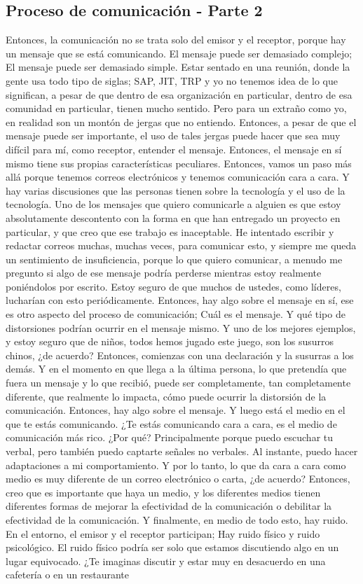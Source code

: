 \documentclass[10pt]{book}
\begin{document}
\subsection{Proceso de comunicación - Parte 2}
Entonces, la comunicación no se trata solo del emisor y el receptor, porque hay un mensaje que se está comunicando. El mensaje puede ser demasiado complejo; El mensaje puede ser demasiado simple.  Estar sentado en una reunión, donde la gente usa todo tipo de siglas; SAP, JIT, TRP y yo no tenemos idea de lo que significan, a pesar de que dentro de esa organización en particular, dentro de esa comunidad en particular, tienen mucho sentido. Pero para un extraño como yo, en realidad son un montón de jergas que no entiendo. Entonces, a pesar de que el mensaje puede ser importante, el uso de tales jergas puede hacer que sea muy difícil para mí, como receptor, entender el mensaje. Entonces, el mensaje en sí mismo tiene sus propias características peculiares. Entonces, vamos un paso más allá porque tenemos correos electrónicos y tenemos comunicación cara a cara. Y hay varias discusiones que las personas tienen sobre la tecnología y el uso de la tecnología. Uno de los mensajes que quiero comunicarle a alguien es que estoy absolutamente descontento con la forma en que han entregado un proyecto en particular, y que creo que ese trabajo es inaceptable. He intentado escribir y redactar correos muchas, muchas veces, para comunicar esto, y siempre me queda un sentimiento de insuficiencia, porque lo que quiero comunicar, a menudo me pregunto si algo de ese mensaje podría perderse mientras estoy realmente poniéndolos por escrito. Estoy seguro de que muchos de ustedes, como líderes, lucharían con esto periódicamente. Entonces, hay algo sobre el mensaje en sí, ese es otro aspecto del proceso de comunicación; Cuál es el mensaje. Y qué tipo de distorsiones podrían ocurrir en el mensaje mismo. Y uno de los mejores ejemplos, y estoy seguro que de niños, todos hemos jugado este juego, son los susurros chinos, ¿de acuerdo? Entonces, comienzas con una declaración y la susurras a los demás. Y en el momento en que llega a la última persona, lo que pretendía que fuera un mensaje y lo que recibió, puede ser completamente, tan completamente diferente, que realmente lo impacta, cómo puede ocurrir la distorsión de la comunicación. Entonces, hay algo sobre el mensaje. Y luego está el medio en el que te estás comunicando. ¿Te estás comunicando cara a cara, es el medio de comunicación más rico. ¿Por qué? Principalmente porque puedo escuchar tu verbal, pero también puedo captarte señales no verbales. Al instante, puedo hacer adaptaciones a mi comportamiento. Y por lo tanto, lo que da cara a cara como medio es muy diferente de un correo electrónico o carta, ¿de acuerdo? Entonces, creo que es importante que haya un medio, y los diferentes medios tienen diferentes formas de mejorar la efectividad de la comunicación o debilitar la efectividad de la comunicación. Y finalmente, en medio de todo esto, hay ruido. En el entorno, el emisor y el receptor participan; Hay ruido físico y ruido psicológico. El ruido físico podría ser solo que estamos discutiendo algo en un lugar equivocado. ¿Te imaginas discutir y estar muy en desacuerdo en una cafetería o en un restaurante 
\end{document}
